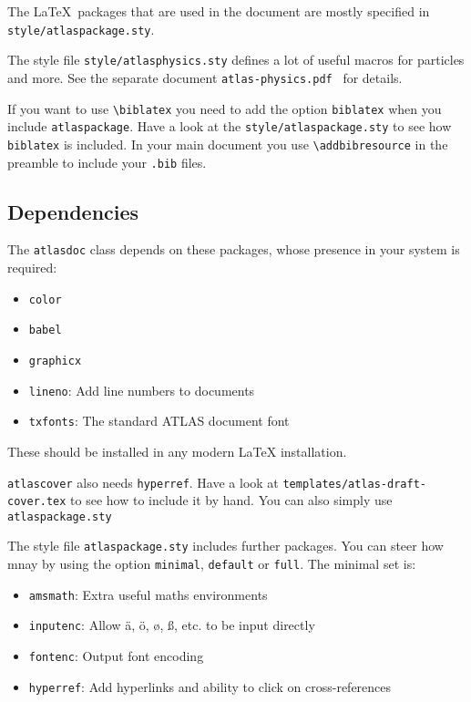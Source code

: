 \documentclass[koma,UKenglish]{style/atlasdoc}
\newcommand{\Macro}[1]{\texttt{\textbackslash #1}\xspace}
\begin{document}
The \LaTeX\ packages that are used in the document are mostly specified in 
\texttt{style/atlaspackage.sty}.

The style file \texttt{style/atlasphysics.sty} defines a lot of useful
macros for particles and more. See the separate document
\texttt{atlas-physics.pdf}~\cite{atlas-physics} for details.

If you want to use \Macro{biblatex} you need to add the option \texttt{biblatex} when you
include \texttt{atlaspackage}.
Have a look at the \texttt{style/atlaspackage.sty} to see how \texttt{biblatex} is included.
In your main document you use \Macro{addbibresource} in the preamble to include your \texttt{.bib} files.


\subsection{Dependencies}

The \texttt{atlasdoc} class depends on these packages, whose presence in
your system is required:
\begin{itemize}\setlength{\parskip}{0pt}\setlength{\itemsep}{0pt}
\item \texttt{color}
\item \texttt{babel}
\item \texttt{graphicx}
\item \texttt{lineno}: Add line numbers to documents
\item \texttt{txfonts}: The standard ATLAS document font
\end{itemize}
These should be installed in any modern \LaTeX{} installation.

\texttt{atlascover} also needs \texttt{hyperref}. 
Have a look at \texttt{templates/atlas-draft-cover.tex} to see how to include it by hand.
You can also simply use \texttt{atlaspackage.sty}

The style file \texttt{atlaspackage.sty} includes further packages.
You can steer how mnay by using the option \texttt{minimal}, \texttt{default} or \texttt{full}.
The minimal set is:
\begin{itemize}\setlength{\parskip}{0pt}\setlength{\itemsep}{0pt}
\item \texttt{amsmath}: Extra useful maths environments
\item \texttt{inputenc}: Allow ä, ö, ø, ß, etc. to be input directly
\item \texttt{fontenc}: Output font encoding
\item \texttt{hyperref}: Add hyperlinks and ability to click on cross-references
\end{itemize}
\end{document}
